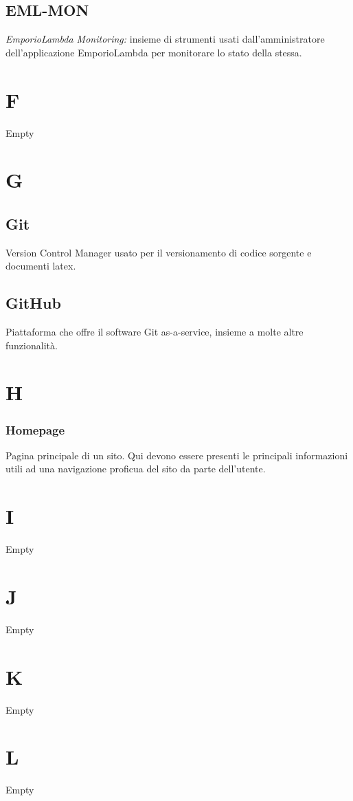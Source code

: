 \subsection*{EML-MON}
\textit{EmporioLambda Monitoring:} insieme di strumenti usati dall'amministratore dell'applicazione EmporioLambda
per monitorare lo stato della stessa.

\section*{F}
Empty

\section*{G}
\subsection*{Git}
Version Control Manager usato per il versionamento di codice sorgente e documenti latex.

\subsection*{GitHub}
Piattaforma che offre il software Git as-a-service, insieme a molte altre funzionalità.

\section*{H}
\subsubsection*{Homepage}
Pagina principale di un sito. Qui devono essere presenti le principali informazioni utili ad una navigazione proficua del
sito da parte dell'utente.

\section*{I}
Empty

\section*{J}
Empty

\section*{K}
Empty

\section*{L}
Empty

